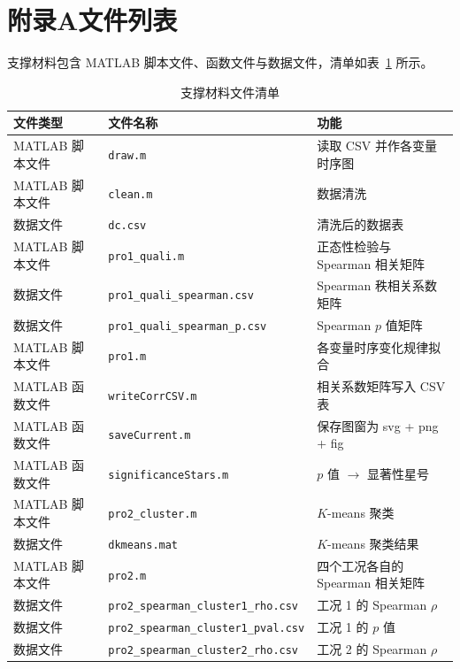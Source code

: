 
\section*{附录A\quad 文件列表}
 
支撑材料包含 MATLAB 脚本文件、函数文件与数据文件，清单如表~\ref{tab:filelist} 所示。

\begin{table}[htbp]
\centering
\caption{支撑材料文件清单}
\label{tab:filelist}
\small
\begin{tabular}{lll}
\toprule
文件类型 & 文件名称 & 功能 \\
\midrule
MATLAB 脚本文件 & \verb|draw.m| & 读取 CSV 并作各变量时序图 \\
MATLAB 脚本文件 & \verb|clean.m| & 数据清洗 \\
数据文件 & \verb|dc.csv| & 清洗后的数据表 \\
MATLAB 脚本文件 & \verb|pro1_quali.m| & 正态性检验与 Spearman 相关矩阵 \\
数据文件 & \verb|pro1_quali_spearman.csv| & Spearman 秩相关系数矩阵 \\
数据文件 & \verb|pro1_quali_spearman_p.csv| & Spearman $p$ 值矩阵 \\
MATLAB 脚本文件 & \verb|pro1.m| & 各变量时序变化规律拟合 \\
MATLAB 函数文件 & \verb|writeCorrCSV.m| & 相关系数矩阵写入 CSV 表 \\
MATLAB 函数文件 & \verb|saveCurrent.m| & 保存图窗为 svg + png + fig \\
MATLAB 函数文件 & \verb|significanceStars.m| & $p$ 值 $\to$ 显著性星号 \\
MATLAB 脚本文件 & \verb|pro2_cluster.m| & $K$-means 聚类 \\
数据文件 & \verb|dkmeans.mat| & $K$-means 聚类结果 \\
MATLAB 脚本文件 & \verb|pro2.m| & 四个工况各自的 Spearman 相关矩阵 \\
数据文件 & \verb|pro2_spearman_cluster1_rho.csv| & 工况 1 的 Spearman $\rho$ \\
数据文件 & \verb|pro2_spearman_cluster1_pval.csv| & 工况 1 的 $p$ 值 \\
数据文件 & \verb|pro2_spearman_cluster2_rho.csv| & 工况 2 的 Spearman $\rho$ \\

\end{tabular}
\end{table}
